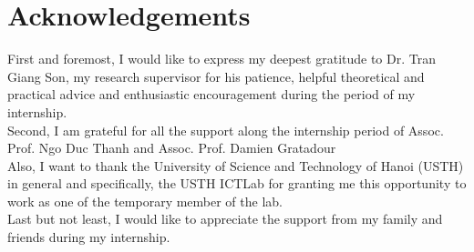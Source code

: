 \chapter*{Acknowledgements}

First and foremost, I would like to express my deepest gratitude to Dr. Tran Giang Son, my research supervisor for his patience, helpful theoretical and practical advice and enthusiastic encouragement during the period of my internship. \\
Second, I am grateful for all the support along the internship period of Assoc. Prof. Ngo Duc Thanh and Assoc. Prof. Damien Gratadour\\
Also, I want to thank the University of Science and Technology of Hanoi (USTH) in general and specifically, the USTH ICTLab for granting me this opportunity to work as one of the temporary member of the lab. \\
Last but not least, I would like to appreciate the support from my family and friends during my internship. \\
